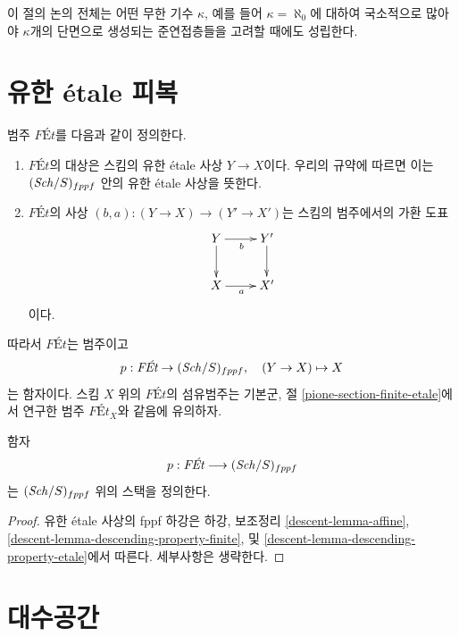 \begin{remark}
\label{remark-higher-rank}
이 절의 논의 전체는 어떤 무한 기수 $\kappa$, 예를 들어
$\kappa = \aleph_0$에 대하여 국소적으로 많아야 $\kappa$개의 단면으로
생성되는 준연접층들을 고려할 때에도 성립한다.
\end{remark}





\section{유한 \'etale 피복}
\label{section-finite-etale}

\noindent
범주 $\textit{F\'Et}$를 다음과 같이 정의한다.
\begin{enumerate}
\item $\textit{F\'Et}$의 대상은 스킴의 유한 \'etale 사상 $Y \to X$이다.
우리의 규약에 따르면 이는 $(\mathit{Sch}/S)_{fppf}$ 안의 유한 \'etale 사상을
뜻한다.
\item $\textit{F\'Et}$의 사상
$(b, a) : (Y \to X) \to (Y' \to X')$는 스킴의 범주에서의 가환 도표
$$
\xymatrix{
Y \ar[d] \ar[r]_b & Y' \ar[d] \\
X \ar[r]_a & X'
}
$$
이다.
\end{enumerate}
따라서 $\textit{F\'Et}$는 범주이고
$$
p : \textit{F\'Et} \to (\Sch/S)_{fppf},
\quad
(Y \to X) \mapsto X
$$
는 함자이다. 스킴 $X$ 위의 $\textit{F\'Et}$의 섬유범주는 기본군, 절
\ref{pione-section-finite-etale}에서 연구한 범주
$\textit{F\'Et}_X$와 같음에 유의하자.

\begin{lemma}
\label{lemma-finite-etale-stack}
함자
$$
p : \textit{F\'Et} \longrightarrow (\Sch/S)_{fppf}
$$
는 $(\mathit{Sch}/S)_{fppf}$ 위의 스택을 정의한다.
\end{lemma}

\begin{proof}
유한 \'etale 사상의 fppf 하강은 하강, 보조정리
\ref{descent-lemma-affine},
\ref{descent-lemma-descending-property-finite}, 및
\ref{descent-lemma-descending-property-etale}에서 따른다. 세부사항은
생략한다.
\end{proof}






\section{대수공간}
\label{section-stack-of-spaces}

